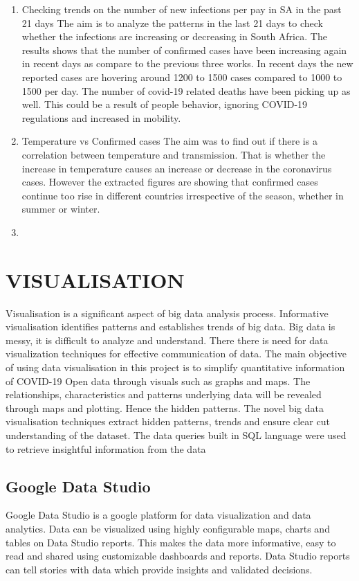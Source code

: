 \documentclass[12pt]{article}
\begin{document}
\begin{enumerate}
    
    \item Checking trends on the number of new infections per pay in SA in the past 21 days
    The aim is to analyze the patterns in the last 21 days  to check whether the infections are increasing or decreasing in South Africa. The results shows that the number of confirmed cases have been increasing again in recent days as compare to the previous three works. In recent days the new reported cases are hovering around 1200 to 1500 cases compared to 1000 to 1500 per day. The number of covid-19 related deaths have been picking up as well. This could be a result of people behavior, ignoring COVID-19 regulations and increased in mobility. 
     
     \item Temperature vs Confirmed cases
     The aim was to find out if there is a correlation between temperature and transmission. That is whether the increase in temperature causes an increase or decrease in the coronavirus cases. However the extracted figures are showing that confirmed cases continue too rise in different countries irrespective of the season, whether in summer or winter. 
     \item 
    
\end{enumerate}

\section{VISUALISATION}
Visualisation is a significant aspect of big data analysis process. Informative visualisation identifies patterns and establishes trends of big data. Big data is messy, it is difficult to analyze and understand. There there is need for data visualization techniques for effective communication of data. The main objective of using data visualisation in this project is to simplify quantitative information of COVID-19 Open data through visuals such as graphs and maps. The relationships, characteristics and patterns underlying data will be revealed through maps and plotting. Hence the  hidden patterns. The novel big data visualisation techniques extract hidden patterns, trends and ensure clear cut understanding of the dataset. The data queries built in SQL language were used to retrieve insightful information from the data


\subsection{Google Data Studio}
 Google Data Studio is a google platform for data visualization and data analytics. Data can be visualized using highly configurable maps, charts and tables on Data Studio reports. This makes the data more informative, easy to read and shared using customizable dashboards and reports. Data Studio reports can tell stories with data which provide insights and validated decisions. 
 
\end{document}
